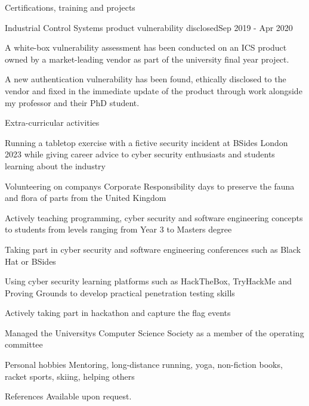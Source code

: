 \documentclass{resume} %
\begin{document}
\begin{rSection}{Certifications, training and projects}
\begin{rSubsection}{Industrial Control Systems product vulnerability disclosed}{Sep 2019 - Apr 2020}{}{}
\item A white-box vulnerability assessment has been conducted on an ICS product owned by a market-leading vendor as part of the university final year project. 

\item A new authentication vulnerability has been found, ethically disclosed to the vendor and fixed in the immediate update of the product through work alongside my professor and their PhD student. 
\end{rSubsection}


\end{rSection}


\begin{rSection}{Extra-curricular activities}
\item Running a tabletop exercise with a fictive security incident at BSides London 2023 while giving career advice to cyber security enthusiasts and students learning about the industry
\item Volunteering on company\textsc{}s Corporate Responsibility days to preserve the fauna and flora of parts from the United Kingdom 
\item Actively teaching programming, cyber security and software engineering concepts to students from levels ranging from Year 3 to Masters degree 
\item Taking part in cyber security and software engineering conferences such as Black Hat or BSides
\item Using cyber security learning platforms such as HackTheBox, TryHackMe and Proving Grounds to develop practical penetration testing skills
\item Actively taking part in hackathon and capture the flag events
\item Managed the University\textsc{}s Computer Science Society as a member of the operating committee\\

\end{rSection}

\begin{rSection}{Personal hobbies}
Mentoring, long-distance running, yoga, non-fiction books, racket sports, skiing, helping others\\
\end{rSection}

\begin{rSection}{References}
Available upon request.
\end{rSection}
\end{document}
